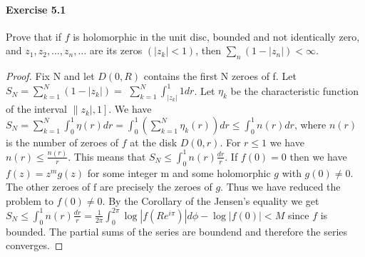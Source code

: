 \documentclass{article}
\begin{document}
\paragraph{Exercise 5.1} Prove that if $f$ is holomorphic in the unit disc, bounded and not identically zero, and $z_{1}, z_{2}, \ldots, z_{n}, \ldots$ are its zeros $\left(\left|z_{k}\right|<1\right)$, then $\sum_{n}\left(1-\left|z_{n}\right|\right)<\infty$.
\begin{proof}
    Fix $\mathrm{N}$ and let $D(0, R)$ contains the first $\mathrm{N}$ zeroes of f. Let $S_N=\sum_{k=1}^N\left(1-\left|z_k\right|\right)=$ $\sum_{k=1}^N \int_{\left|z_k\right|}^1 1 d r$. Let $\eta_k$ be the characteristic function of the interval $\left.\| z_k \mid, 1\right]$. We have $S_N=\sum_{k=1}^N \int_0^1 \eta(r) d r=\int_0^1\left(\sum_{k=1}^N \eta_k(r)\right) d r \leq \int_0^1 n(r) d r$, where $n(r)$ is the number of zeroes of $f$ at the disk $D(0, r)$. For $r \leq 1$ we have $n(r) \leq \frac{n(r)}{r}$. This means that $S_N \leq \int_0^1 n(r) \frac{d r}{r}$. If $f(0)=0$ then we have $f(z)=z^m g(z)$ for some integer $\mathrm{m}$ and some holomorphic $g$ with $g(0) \neq 0$. The other zeroes of $\mathrm{f}$ are precisely the zeroes of $g$. Thus we have reduced the problem to $f(0) \neq 0$. By the Corollary of the Jensen's equality we get $S_N \leq \int_0^1 n(r) \frac{d r}{r}=\frac{1}{2 \pi} \int_0^{2 \pi} \log \left|f\left(R e^{i \pi}\right)\right| d \phi-\log |f(0)|<M$ since $f$ is bounded. The partial sums of the series are boundend and therefore the series converges.
\end{proof}
\end{document}
